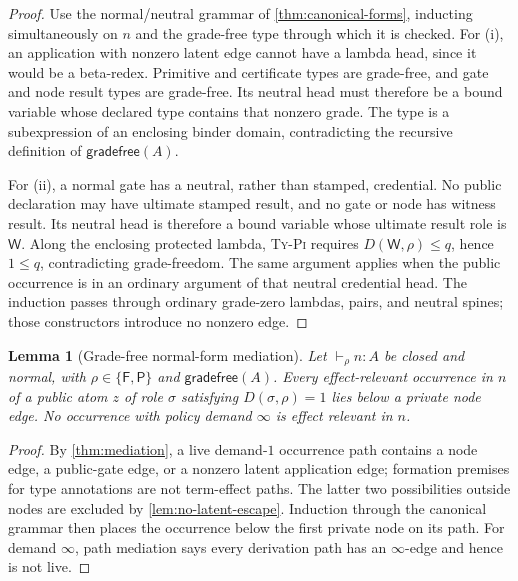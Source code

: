 \documentclass[11pt]{article}
\numberwithin{equation}{section}
\theoremstyle{definition}
\theoremstyle{plain}
\newtheorem{lemma}[definition]{Lemma}
\theoremstyle{remark}
\newcommand{\Frm}{\mathsf F}
\newcommand{\Prs}{\mathsf P}
\newcommand{\Wit}{\mathsf W}
\newcommand{\absent}{\boldsymbol\infty}
\begin{document}
\begin{proof}
Use the normal/neutral grammar of \cref{thm:canonical-forms}, inducting
simultaneously on \(n\) and the grade-free type through which it is checked.
For (i), an application with nonzero latent edge cannot have a lambda head,
since it would be a beta-redex.  Primitive and certificate types are
grade-free, and gate and node result types are grade-free.  Its neutral head
must therefore be a bound variable whose declared type contains that nonzero
grade.  The type is a subexpression of an enclosing binder domain, contradicting
the recursive definition of \(\mathsf{gradefree}(A)\).

For (ii), a normal gate has a neutral, rather than stamped, credential.
No public declaration may have ultimate stamped result, and no gate or node
has witness result.  Its neutral head is therefore a bound variable whose
ultimate result role is \(\Wit\).  Along the enclosing protected lambda,
\textsc{Ty-Pi} requires
\(D(\Wit,\rho)\le q\), hence \(1\le q\), contradicting grade-freedom.
The same argument applies when the public occurrence is in an ordinary
argument of that neutral credential head.  The induction passes through
ordinary grade-zero lambdas, pairs, and neutral spines; those constructors
introduce no nonzero edge.
\end{proof}

\begin{lemma}[Grade-free normal-form mediation]\label{lem:gradefree-mediation}
Let \(\vdash_{\rho}n:A\) be closed and normal, with
\(\rho\in\{\Frm,\Prs\}\) and \(\mathsf{gradefree}(A)\).  Every
effect-relevant occurrence in \(n\) of a public atom \(z\) of role \(\sigma\) satisfying
\(D(\sigma,\rho)=1\) lies below a private node edge.  No occurrence with
policy demand \(\absent\) is effect relevant in \(n\).
\end{lemma}

\begin{proof}
By \cref{thm:mediation}, a live demand-\(1\) occurrence path contains a node
edge, a public-gate edge, or a nonzero latent application edge; formation
premises for type annotations are not term-effect paths.  The latter two
possibilities outside nodes are excluded by
\cref{lem:no-latent-escape}.  Induction through the canonical grammar then
places the occurrence below the first private node on its path.  For demand
\(\absent\), path mediation says every derivation path has an
\(\absent\)-edge and hence is not live.
\end{proof}
\end{document}
